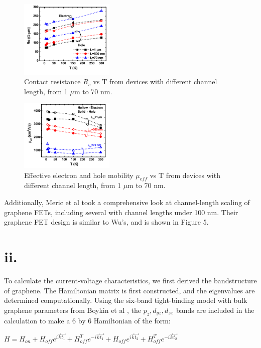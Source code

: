 \documentclass[11pt]{article}
\begin{document}
\begin{figure}[h!]
\centering 
\includegraphics[width=0.4\textwidth]{paper1_contactres.png}
\caption{Contact resistance $R_c$ vs T from devices with different channel length, from 1 $\mu$m to 70 nm.}\label{fig:FET}
\end{figure}

\begin{figure}[h!]
\centering 
\includegraphics[width=0.4\textwidth]{paper1_mobilitydata.png}
\caption{Effective electron and hole mobility $\mu_{eff}$ vs T from devices with different channel length, from 1 $\mu$m to 70 nm.}\label{fig:FET}
\end{figure}

Additionally, Meric et al \cite{meric2008} took a comprehensive look at channel-length scaling of graphene FETs, including several with channel lengths under 100 nm. Their graphene FET design is similar to Wu's, and is shown in Figure 5.

\section*{ii.} To calculate the current-voltage characteristics, we first derived the bandstructure of graphene. The Hamiltonian matrix is first constructed, and the eigenvalues are determined computationally. Using the six-band tight-binding model with bulk graphene parameters from Boykin et al \cite{boykin2011}, the $p_z,d_{yz}, d_{zx}$ bands are included in the calculation to make a 6 by 6 Hamiltonian of the form:

$H = H_{on} + H_{off}e^{i\vec{k}\vec{t_1}} + H^T_{off}e^{-i\vec{k}\vec{t_1}} + H_{off}e^{i\vec{k}\vec{t_2}} + H^T_{off}e^{-i\vec{k}\vec{t_2}}$
\end{document}
